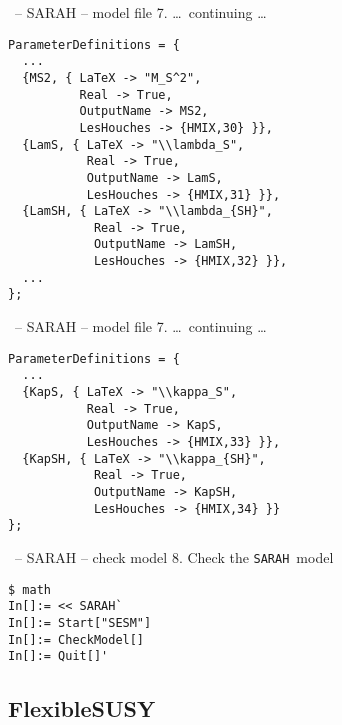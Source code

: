 \documentclass[11pt]{beamer}
\newcommand{\SARAH}{\texttt{SARAH}}
\begin{document}

\begin{frame}[fragile]{\insertsection\ -- SARAH -- model file}
  7. \ldots\ continuing \ldots
  \begin{lstlisting}
ParameterDefinitions = {
  ...
  {MS2, { LaTeX -> "M_S^2",
          Real -> True,
          OutputName -> MS2,
          LesHouches -> {HMIX,30} }},
  {LamS, { LaTeX -> "\\lambda_S",
           Real -> True,
           OutputName -> LamS,
           LesHouches -> {HMIX,31} }},
  {LamSH, { LaTeX -> "\\lambda_{SH}",
            Real -> True,
            OutputName -> LamSH,
            LesHouches -> {HMIX,32} }},
  ...
};\end{lstlisting}
\end{frame}


\begin{frame}[fragile]{\insertsection\ -- SARAH -- model file}
  7. \ldots\ continuing \ldots
  \begin{lstlisting}
ParameterDefinitions = {
  ...
  {KapS, { LaTeX -> "\\kappa_S",
           Real -> True,
           OutputName -> KapS,
           LesHouches -> {HMIX,33} }},
  {KapSH, { LaTeX -> "\\kappa_{SH}",
            Real -> True,
            OutputName -> KapSH,
            LesHouches -> {HMIX,34} }}
};\end{lstlisting}
\end{frame}


\begin{frame}[fragile]{\insertsection\ -- SARAH -- check model}
  8. Check the \SARAH\ model
  \begin{lstlisting}
$ math
In[]:= << SARAH`
In[]:= Start["SESM"]
In[]:= CheckModel[]
In[]:= Quit[]'\end{lstlisting}%
\end{frame}


\subsection{FlexibleSUSY}
\end{document}
